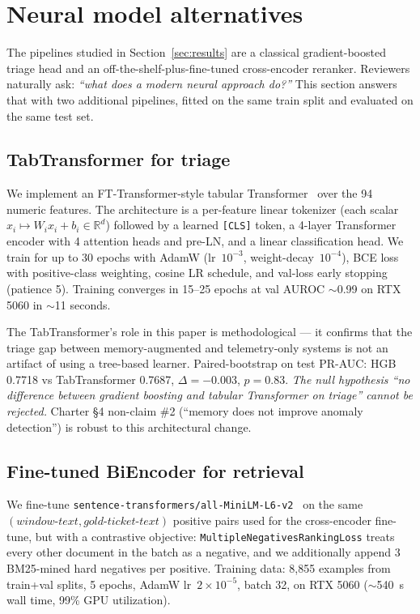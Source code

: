 \section{Neural model alternatives}
\label{sec:neural}

The pipelines studied in Section~\ref{sec:results} are a classical gradient-boosted triage head and an off-the-shelf-plus-fine-tuned cross-encoder reranker. Reviewers naturally ask: \emph{``what does a modern neural approach do?''} This section answers that with two additional pipelines, fitted on the same train split and evaluated on the same test set.

\subsection{TabTransformer for triage}
\label{sec:tabtransformer}

We implement an FT-Transformer-style tabular Transformer~\cite{gorishniy2021ft} over the 94 numeric features. The architecture is a per-feature linear tokenizer (each scalar $x_i \mapsto W_i x_i + b_i \in \mathbb{R}^d$) followed by a learned \texttt{[CLS]} token, a 4-layer Transformer encoder with 4 attention heads and pre-LN, and a linear classification head. We train for up to 30 epochs with AdamW (lr~$10^{-3}$, weight-decay~$10^{-4}$), BCE loss with positive-class weighting, cosine LR schedule, and val-loss early stopping (patience 5). Training converges in 15–25 epochs at val AUROC $\sim$0.99 on RTX 5060 in $\sim$11 seconds.

The TabTransformer's role in this paper is methodological --- it confirms that the triage gap between memory-augmented and telemetry-only systems is not an artifact of using a tree-based learner. Paired-bootstrap on test PR-AUC: HGB 0.7718 vs TabTransformer 0.7687, $\Delta = -0.003$, $p = 0.83$. \emph{The null hypothesis ``no difference between gradient boosting and tabular Transformer on triage'' cannot be rejected.} Charter §4 non-claim \#2 (``memory does not improve anomaly detection'') is robust to this architectural change.

\subsection{Fine-tuned BiEncoder for retrieval}

We fine-tune \texttt{sentence-transformers/all-MiniLM-L6-v2}~\cite{wang2020minilm} on the same $(\textit{window-text}, \textit{gold-ticket-text})$ positive pairs used for the cross-encoder fine-tune, but with a contrastive objective: \texttt{MultipleNegativesRankingLoss} treats every other document in the batch as a negative, and we additionally append 3 BM25-mined hard negatives per positive. Training data: 8{,}855 examples from train+val splits, 5 epochs, AdamW lr~$2\times10^{-5}$, batch 32, on RTX 5060 ($\sim$540~s wall time, 99\% GPU utilization).

